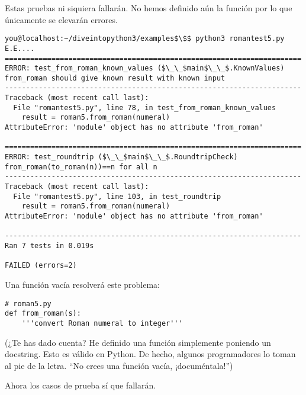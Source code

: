 Estas pruebas ni siquiera fallarán. No hemos definido aún la función  por lo que únicamente se elevarán errores.

\noindent\begin{minipage}{\textwidth}
\begin{lstlisting}[mathescape=True]
you@localhost:~/diveintopython3/examples$\$$ python3 romantest5.py
E.E....
======================================================================
ERROR: test_from_roman_known_values ($\_\_$main$\_\_$.KnownValues)
from_roman should give known result with known input
----------------------------------------------------------------------
Traceback (most recent call last):
  File "romantest5.py", line 78, in test_from_roman_known_values
    result = roman5.from_roman(numeral)
AttributeError: 'module' object has no attribute 'from_roman'

======================================================================
ERROR: test_roundtrip ($\_\_$main$\_\_$.RoundtripCheck)
from_roman(to_roman(n))==n for all n
----------------------------------------------------------------------
Traceback (most recent call last):
  File "romantest5.py", line 103, in test_roundtrip
    result = roman5.from_roman(numeral)
AttributeError: 'module' object has no attribute 'from_roman'

----------------------------------------------------------------------
Ran 7 tests in 0.019s

FAILED (errors=2)
\end{lstlisting}
\end{minipage}

Una función vacía resolverá este problema:

\noindent\begin{minipage}{\textwidth}
\begin{lstlisting}[mathescape=True]
# roman5.py
def from_roman(s):
    '''convert Roman numeral to integer'''
\end{lstlisting}
\end{minipage}

(¿Te has dado cuenta? He definido una función simplemente poniendo un docstring. Esto es válido en Python. De hecho, algunos programadores lo toman al pie de la letra. ``No crees una función vacía, ¡documéntala!'')

Ahora los casos de prueba sí que fallarán.

